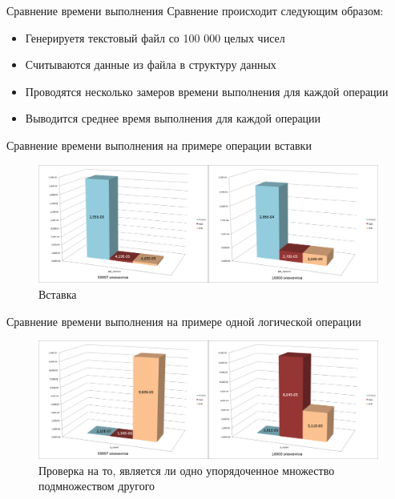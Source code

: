 \documentclass{beamer}
\begin{document}
	\begin{frame}{Сравнение времени выполнения}
		Сравнение происходит следующим образом:
		\begin{itemize}
			\item Генерируетя текстовый файл со 100 000 целых чисел
			\item Считываются данные из файла в структуру данных
			\item Проводятся несколько замеров времени выполнения для каждой операции
			\item Выводится среднее время выполнения для каждой операции
		\end{itemize}
	\end{frame}
	
	\begin{frame}{Сравнение времени выполнения на примере операции вставки}
		\begin{figure}
			\includegraphics[scale=0.18]{img/histograms/add_element.png}
			\caption{Вставка}
		\end{figure}
	\end{frame}
	
	
	\begin{frame}{Сравнение времени выполнения на примере одной логической операции}				
		\begin{figure}
			\includegraphics[scale=0.18]{img/histograms/is_subset.png}
			\caption{Проверка на то, является ли одно упорядоченное множество подмножеством другого}
		\end{figure}
	\end{frame}
	
\end{document}

